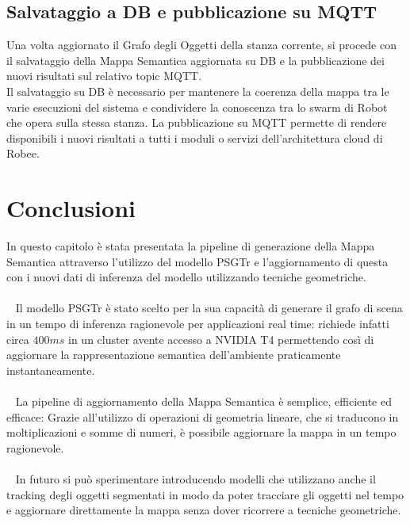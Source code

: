 \subsection{Salvataggio a DB e pubblicazione su MQTT}
Una volta aggiornato il Grafo degli Oggetti della stanza corrente, si procede con il salvataggio della Mappa Semantica aggiornata su DB e la pubblicazione dei nuovi risultati sul relativo topic MQTT.\\
Il salvataggio su DB è necessario per mantenere la coerenza della mappa tra le varie esecuzioni del sistema e condividere la conoscenza tra lo swarm di Robot che opera sulla stessa stanza. La pubblicazione su MQTT permette di rendere disponibili i nuovi risultati a tutti i moduli o servizi dell'architettura cloud di Robee.

\section{Conclusioni}
In questo capitolo è stata presentata la pipeline di generazione della Mappa Semantica attraverso l'utilizzo del modello PSGTr e l'aggiornamento di questa con i nuovi dati di inferenza del modello utilizzando tecniche geometriche.\\\\
~
Il modello PSGTr è stato scelto per la sua capacità di generare il grafo di scena in un tempo di inferenza ragionevole per applicazioni real time: richiede infatti circa $400ms$ in un cluster avente accesso a NVIDIA T4 permettendo così di aggiornare la rappresentazione semantica dell'ambiente praticamente instantaneamente.\\\\
~
La pipeline di aggiornamento della Mappa Semantica è semplice, efficiente ed efficace: Grazie all'utilizzo di operazioni di geometria lineare, che si traducono in moltiplicazioni e somme di numeri, è possibile aggiornare la mappa in un tempo ragionevole.\\\\
~
In futuro si può sperimentare introducendo modelli \cite{yang2023pvsg} che utilizzano anche il tracking degli oggetti segmentati in modo da poter tracciare gli oggetti nel tempo e aggiornare direttamente la mappa senza dover ricorrere a tecniche geometriche.

